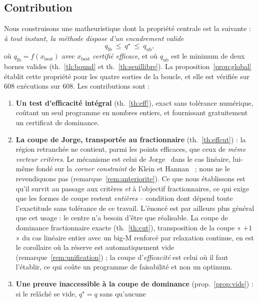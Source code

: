 \documentclass[11pt,a4paper]{article}
\theoremstyle{plain}
\theoremstyle{remark}
\newcommand{\qs}{q^{\star}}
\begin{document}
\subsection{Contribution}

Nous construisons une matheuristique dont la propriété centrale est la
suivante : \emph{à tout instant, la méthode dispose d'un encadrement valide}
\[
  q_{\text{lb}}\ \le\ \qs\ \le\ q_{\text{ub}} ,
\]
où $q_{\text{lb}}=f(x_{\text{best}})$ avec $x_{\text{best}}$ \emph{certifié
efficace}, et où $q_{\text{ub}}$ est le minimum de deux bornes valides
(th.~\ref{th:bound} et th.~\ref{th:seuillibre}). La
proposition~\ref{prop:global} établit cette propriété pour les quatre
sorties de la boucle, et elle est vérifiée sur $608$ exécutions sur $608$.
Les contributions sont :

\begin{enumerate}[leftmargin=*,itemsep=2pt]
\item \textbf{Un test d'efficacité intégral} (th.~\ref{th:eff}), exact sans
      tolérance numérique, coûtant un seul programme en nombres entiers, et
      fournissant gratuitement un certificat de dominance.
\item \textbf{La coupe de Jorge, transportée au fractionnaire}
      (th.~\ref{th:effcut}) : la région retranchée ne contient, parmi les
      points efficaces, que ceux de \emph{même vecteur critères}. Le
      mécanisme est celui de Jorge~\cite{jorge2009} dans le cas linéaire,
      lui-même fondé sur la \emph{corner constraint} de Klein et
      Hannan~\cite{klein1982} ; nous ne le revendiquons pas
      (remarque~\ref{rem:anteriorite}). Ce que nous établissons est qu'il
      survit au passage aux critères \emph{et} à l'objectif
      fractionnaires, ce qui exige que les formes de coupe restent
      \emph{entières} -- condition dont dépend toute l'exactitude sans
      tolérance de ce travail. L'énoncé est par ailleurs plus général que
      cet usage : le centre n'a besoin d'être que réalisable. La coupe
      de
      dominance fractionnaire exacte (th.~\ref{th:cut}), transposition de la
      coupe « $+1$ » du cas linéaire entier avec un big-M renforcé par
      relaxation continue, en est le corollaire où la réserve est
      automatiquement vide (remarque~\ref{rem:unification}) ; la coupe
      d'\emph{efficacité} est celui où il faut l'établir, ce qui coûte un
      programme de faisabilité et non un optimum.
\item \textbf{Une preuve inaccessible à la coupe de dominance}
      (prop.~\ref{prop:vide}) : si le relâché se vide, $\qs=q$ sans qu'aucune

\end{enumerate}
\end{document}

